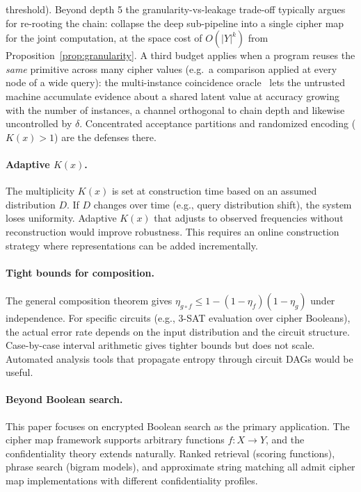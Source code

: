 \documentclass[11pt]{article}
\theoremstyle{definition}
\theoremstyle{plain}
\theoremstyle{remark}
\begin{document}
threshold).  Beyond depth 5 the granularity-vs-leakage trade-off
typically argues for re-rooting the chain: collapse the deep
sub-pipeline into a single cipher map for the joint computation, at
the space cost of $O(|Y|^k)$ from Proposition~\ref{prop:granularity}.
A third budget applies when a program reuses the \emph{same}
primitive across many cipher values (e.g.\ a comparison applied at
every node of a wide query): the multi-instance coincidence
oracle~\cite[Thm.~8.2]{towell2026cipher} lets the untrusted machine
accumulate evidence about a shared latent value at accuracy growing
with the number of instances, a channel orthogonal to chain depth and
likewise uncontrolled by $\delta$.  Concentrated acceptance partitions
and randomized encoding ($K(x) > 1$) are the defenses there.

\paragraph{Adaptive $K(x)$.}
The multiplicity $K(x)$ is set at construction time based on an assumed
distribution $D$.  If $D$ changes over time (e.g., query distribution
shift), the system loses uniformity.  Adaptive $K(x)$ that adjusts to
observed frequencies without reconstruction would improve robustness.
This requires an online construction strategy where representations can
be added incrementally.

\paragraph{Tight bounds for composition.}
The general composition theorem gives
$\eta_{g \circ f} \leq 1 - (1 - \eta_f)(1 - \eta_g)$ under
independence.  For specific circuits (e.g., 3-SAT evaluation over cipher
Booleans), the actual error rate depends on the input distribution and
the circuit structure.  Case-by-case interval arithmetic gives tighter
bounds but does not scale.  Automated analysis tools that propagate
entropy through circuit DAGs would be useful.

\paragraph{Beyond Boolean search.}
This paper focuses on encrypted Boolean search as the primary
application.  The cipher map framework supports arbitrary functions
$f : X \to Y$, and the confidentiality theory extends naturally.  Ranked
retrieval (scoring functions), phrase search (bigram models), and
approximate string matching all admit cipher map implementations with
different confidentiality profiles.
\end{document}
